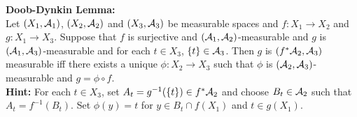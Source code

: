\documentclass{book}
\begin{document}
	\begin{ex}  \textbf{Doob-Dynkin Lemma:} \\
		Let $(X_1, \mathcal{A}_1)$, $(X_2, \mathcal{A}_2)$ and $(X_3, \mathcal{A}_3)$ be measurable spaces and $f: X_1 \rightarrow X_2$ and $g:X_1 \rightarrow X_3$. Suppose that $f$ is surjective and $(\mathcal{A}_1, \mathcal{A}_2)$-measurable and $g$ is $(\mathcal{A}_1 , \mathcal{A}_3)$-measurable and for each $t \in X_3$, $\{t\} \in \mathcal{A}_3$. Then $g$ is $(f^*\mathcal{A}_2, \mathcal{A}_3)$ measurable iff there exists a unique $\phi: X_2 \rightarrow X_3$ such that $\phi$ is $(\mathcal{A}_2, \mathcal{A}_3)$-measurable and $g = \phi \circ f$. \\
		\textbf{Hint:} For each $t \in X_3$, set $A_t = g^{-1}(\{t\}) \in f^* \mathcal{A}_2$ and choose $B_t \in \mathcal{A}_2$ such that $A_t = f^{-1}(B_t)$. Set $\phi(y) = t$ for $y \in B_t \cap f(X_1)$ and $t \in g(X_1)$.
	\end{ex}
	
\end{document}
